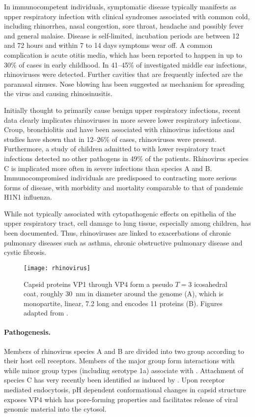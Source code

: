 In immunocompetent individuals, symptomatic disease typically manifests as upper respiratory infection with clinical syndromes associated with common cold, including rhinorrhea, nasal congestion, sore throat, headache and possibly fever and general malaise. Disease is self-limited, incubation periods are between 12 and 72 hours and within 7 to 14 days symptoms wear off. A common complication is acute otitis media, which has been reported to happen in up to 30\% of cases in early childhood. In 41--45\% of investigated middle ear infections, rhinoviruses were detected. Further cavities that are frequently infected are the paranasal sinuses. Nose blowing has been suggested as mechanism for spreading the virus and causing rhinosinusitis.

Initially thought to primarily cause benign upper respiratory infections,  recent data clearly implicates rhinoviruses in more severe lower respiratory infections. Croup, bronchiolitis and  have been associated with rhinovirus infections and studies have shown that in 12--26\% of cases, rhinoviruses were present. Furthermore, a study of children admitted to  with lower respiratory tract infections detected no other pathogens in 49\% of the patients. Rhinovirus species C is implicated more often in severe infections than species A and B. Immunocompromised individuals are predisposed to contracting more serious forms of disease, with morbidity and mortality comparable to that of pandemic H1N1 influenza.

While not typically associated with cytopathogenic effects on epithelia of the upper respiratory tract, cell damage to lung tissue, especially among children, has been documented. Thus, rhinoviruses are linked to exacerbations of chronic pulmonary diseases such as asthma, chronic obstructive pulmonary disease and cystic fibrosis.

\begin{figure}
  \centering
  \texttt{[image: rhinovirus]}
  \caption[Capsid structure and genome of rhinoviruses.]{Capsid proteins VP1 through VP4 form a pseudo $T=3$ icosahedral coat, roughly \SI{30}{\nano\meter} in diameter around the  genome (A), which is monopartite, linear, \SI{7.2}{\kilobase} long and encodes 11 proteins (B). Figures adapted from \citet{Hulo2011}.}
  \label{fig:rhinovirus}
\end{figure}

\paragraph{Pathogenesis.}
Members of rhinovirus species A and B are divided into two group according to their host cell receptors. Members of the major group form interactions with  while minor group types (including serotype 1a) associate with . Attachment of species C has very recently been identified as induced by . Upon receptor mediated endocytosis, pH dependent conformational changes in capsid structure exposes VP4 which has pore-forming properties and facilitates release of viral genomic material into the cytosol.

